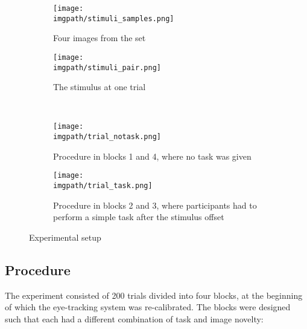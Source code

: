 {\begin{figure}[ht]
  \centering
  \begin{subfigure}{0.48 \linewidth}
      \texttt{[image: \\imgpath/stimuli\_samples.png]}
      \caption{Four images from the set}
    \label{fig:globsal-stimuli_samples}
  \end{subfigure}
  \hspace{0.02 \linewidth}
  \begin{subfigure}{0.48 \linewidth}
      \centering
      \texttt{[image: \\imgpath/stimuli\_pair.png]}
      \caption{The stimulus at one trial}
    \label{fig:globsal-stimuli_pair}
  \end{subfigure}
  \\
  \begin{subfigure}{0.43 \linewidth}
      \centering
      \texttt{[image: \\imgpath/trial\_notask.png]}
      \caption{Procedure in blocks 1 and 4, where no task was given}
    \label{fig:globsal-trial_notask}
  \end{subfigure}
  \hspace{0.02 \linewidth}
  \begin{subfigure}{0.53 \linewidth}
      \centering
      \texttt{[image: \\imgpath/trial\_task.png]}
      \caption{Procedure in blocks 2 and 3, where participants had to perform a simple task after the stimulus offset}
    \label{fig:globsal-trial_task}
  \end{subfigure}
  \caption{Experimental setup}
\label{fig:globsal-experiment}
\end{figure}

\subsection{Procedure}
\label{sec:globsal-methods_procedure}

The experiment consisted of 200 trials divided into four blocks, at the beginning of which the eye-tracking system was re-calibrated. The blocks were designed such that each had a different combination of task and image novelty:

}
